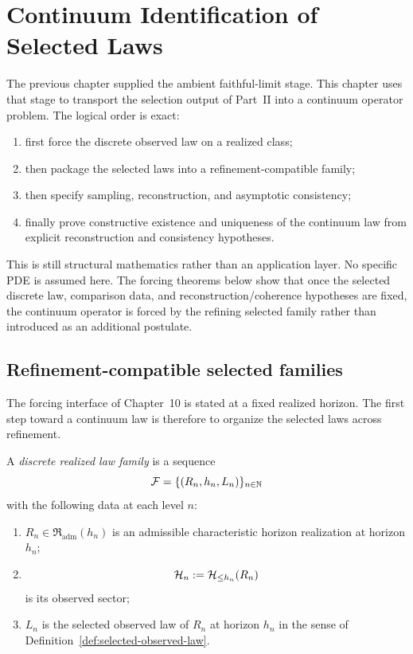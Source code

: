\section{Continuum Identification of Selected Laws}
\label{sec:continuum-identification}

The previous chapter supplied the ambient faithful-limit stage. This
chapter uses that stage to transport the selection output of Part~II into a
continuum operator problem. The logical order is exact:
\begin{enumerate}[label=(\roman*), leftmargin=2em, itemsep=0.2em]
\item first force the discrete observed law on a realized class;
\item then package the selected laws into a refinement-compatible family;
\item then specify sampling, reconstruction, and asymptotic consistency;
\item finally prove constructive existence and uniqueness of the continuum law
      from explicit reconstruction and consistency hypotheses.
\end{enumerate}
This is still structural mathematics rather than an application layer. No
specific PDE is assumed here. The forcing theorems below show that once the
selected discrete law, comparison data, and reconstruction/coherence
hypotheses are fixed, the continuum operator is forced by the refining
selected family rather than introduced as an additional postulate.

\subsection{Refinement-compatible selected families}

The forcing interface of Chapter~10 is stated at a fixed realized horizon. The
first step toward a continuum law is therefore to organize the selected laws
across refinement.

\begin{definition}
\label{def:discrete-realized-law-family}
A \emph{discrete realized law family} is a sequence
\[
\mathcal F=\{(R_n,h_n,L_n)\}_{n\in\mathbb{N}}
\]
with the following data at each level $n$:
\begin{enumerate}[label=(\roman*), leftmargin=2em, itemsep=0.2em]
\item $R_n\in \mathfrak R_{\mathrm{adm}}(h_n)$ is an admissible characteristic
      horizon realization at horizon $h_n$;
\item
      \[
      \mathcal{H}_n:=\mathcal{H}_{\le h_n}(R_n)
      \]
      is its observed sector;
\item $L_n$ is the selected observed law of $R_n$ at horizon $h_n$ in the
      sense of Definition~\ref{def:selected-observed-law}.
\end{enumerate}
\end{definition}

